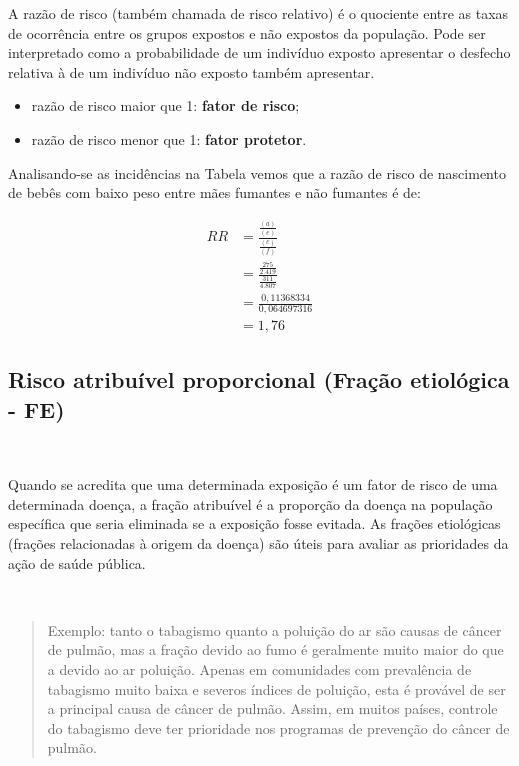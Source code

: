 \documentclass[
]{book}
\providecommand{\tightlist}{%
  \setlength{\itemsep}{0pt}\setlength{\parskip}{0pt}}
\begin{document}
\hfill\break

A razão de risco (também chamada de risco relativo) é o quociente entre as taxas de ocorrência entre os grupos expostos e não expostos da população. Pode ser interpretado como a probabilidade de um indivíduo exposto apresentar o desfecho relativa à de um indivíduo não exposto também apresentar.

\hfill\break

\begin{itemize}
\tightlist
\item
  razão de risco maior que 1: \textbf{fator de risco};\\
\item
  razão de risco menor que 1: \textbf{fator protetor}.
\end{itemize}

\hfill\break

Analisando-se as incidências na Tabela vemos que a razão de risco de nascimento de bebês com baixo peso entre mães fumantes e não fumantes é de:

\hfill\break

\begin{align*}
RR  & =  \frac{\frac{(a)}{(e)}}{\frac{(c)}{(f)}}  \\
& = \frac{\frac{275}{2.419}}{\frac{311}{4.807}} \\ 
& = \frac{0,11368334}{0,064697316} \\
& = 1,76 
\end{align*}

\hfill\break

\hypertarget{risco-atribuuxedvel-proporcional-frauxe7uxe3o-etioluxf3gica---fe}{%
\subsection{Risco atribuível proporcional (Fração etiológica - FE)}\label{risco-atribuuxedvel-proporcional-frauxe7uxe3o-etioluxf3gica---fe}}

~

Quando se acredita que uma determinada exposição é um fator de risco de uma determinada doença, a fração atribuível é a proporção da doença na população específica que seria eliminada se a exposição fosse evitada. As frações etiológicas (frações relacionadas à origem da doença) são úteis para avaliar as prioridades da ação de saúde pública.

~

\begin{quote}
Exemplo: tanto o tabagismo quanto a poluição do ar são causas de câncer de pulmão, mas a fração devido ao fumo é geralmente muito maior do que a devido ao ar poluição. Apenas em comunidades com prevalência de tabagismo muito baixa e severos índices de poluição, esta é provável de ser a principal causa de câncer de pulmão. Assim, em muitos países, controle do tabagismo deve ter prioridade nos programas de prevenção do câncer de pulmão.
\end{quote}
\end{document}
